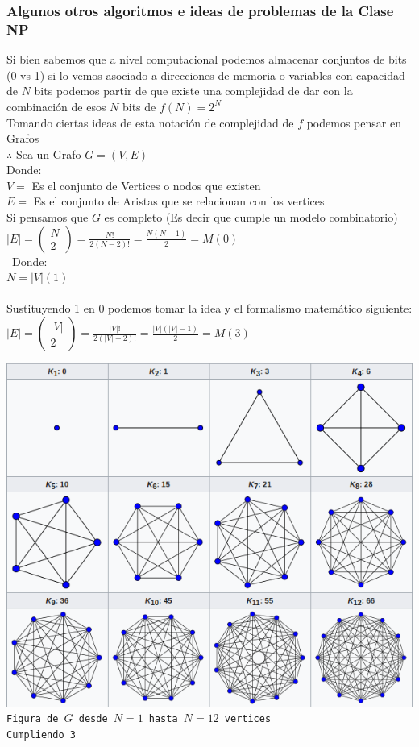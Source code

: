 \documentclass[10pt,executivepaper]{article}
\newcommand\tab[1][1cm]{\hspace*{#1}}
\begin{document}
\subsubsection{Algunos otros algoritmos e ideas de problemas de la Clase NP}
Si bien sabemos que a nivel computacional podemos almacenar conjuntos de bits (0 vs 1) si lo vemos asociado a direcciones de memoria o variables con capacidad de $N$ bits podemos partir de que existe una complejidad de dar con la combinación de esos $N$ bits de $f(N)=2^N$ \\
Tomando ciertas ideas de esta notación de complejidad de $f$ podemos pensar en Grafos \\$\therefore$ Sea un Grafo $G=(V,E)$ \\Donde:\\
\tab $V=$ Es el conjunto de Vertices o nodos que existen
\\\tab $E=$ Es el conjunto de Aristas que se relacionan con los vertices\\
Si pensamos que $G$ es completo (Es decir que cumple un modelo combinatorio)\\
\tab\tab$|E|=\begin{pmatrix}
  N\\2
\end{pmatrix} = \frac{N!}{2(N-2)!} = \frac{N(N-1)}{2} = M$\tab$(0)$\\
\tab\ Donde:
\\\tab $N=|V|$\tab$(1)$\\
\\Sustituyendo 1 en 0 podemos tomar la idea y el formalismo matemático siguiente:\\
\tab $|E|=\begin{pmatrix}
  |V|\\2
\end{pmatrix} = \frac{|V|!}{2(|V|-2)!} = \frac{|V| ( |V|-1 )}{2} = M $\tab$(3)$\\
\begin{center}
  \includegraphics[scale=0.5]{images/grafoCompleto.png}\\
  \texttt{Figura de $G$ desde $N=1$ hasta $N=12$ vertices\\Cumpliendo 3}
\end{center}
\end{document}
